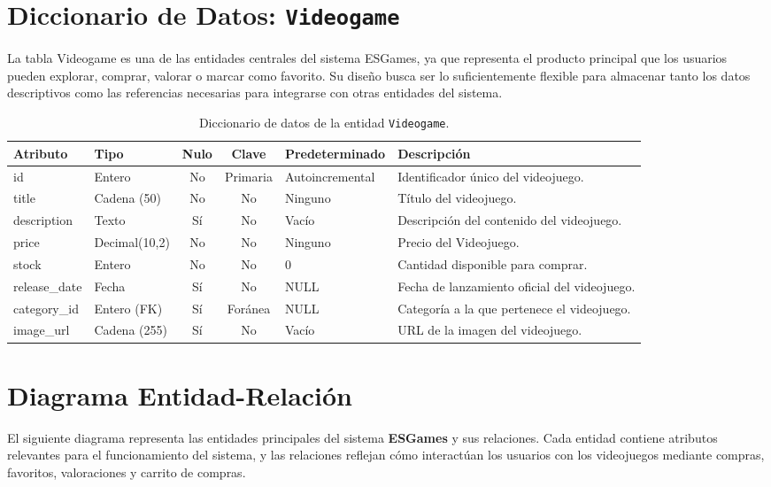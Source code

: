 \documentclass{article}
\begin{document}
	
\section{Diccionario de Datos: \texttt{Videogame}}
La tabla Videogame es una de las entidades centrales del sistema ESGames, ya que representa el producto principal que los usuarios pueden explorar, comprar, valorar o marcar como favorito. Su diseño busca ser lo suficientemente flexible para almacenar tanto los datos descriptivos como las referencias necesarias para integrarse con otras entidades del sistema.
\begin{table}[H]
\centering
\begin{tabular}{|l|l|c|c|l|p{6cm}|}
\hline
\textbf{Atributo} & \textbf{Tipo} & \textbf{Nulo} & \textbf{Clave} & \textbf{Predeterminado} & \textbf{Descripción} \\
\hline
id & Entero & No & Primaria & Autoincremental & Identificador único del videojuego. \\
title & Cadena (50) & No & No & Ninguno & Título del videojuego. \\
description & Texto & Sí & No & Vacío & Descripción del contenido del videojuego. \\
price & Decimal(10,2) & No & No & Ninguno & Precio del Videojuego. \\
stock & Entero & No & No & 0 & Cantidad disponible para comprar. \\
release\_date & Fecha & Sí & No & NULL & Fecha de lanzamiento oficial del videojuego. \\
category\_id & Entero (FK) & Sí & Foránea & NULL & Categoría a la que pertenece el videojuego. \\
image\_url & Cadena (255) & Sí & No & Vacío & URL de la imagen del videojuego. \\
\hline
\end{tabular}
\caption{Diccionario de datos de la entidad \texttt{Videogame}.}
\end{table}

\section{Diagrama Entidad-Relación}
El siguiente diagrama representa las entidades principales del sistema \textbf{ESGames} y sus relaciones. Cada entidad contiene atributos relevantes para el funcionamiento del sistema, y las relaciones reflejan cómo interactúan los usuarios con los videojuegos mediante compras, favoritos, valoraciones y carrito de compras.
\end{document}

